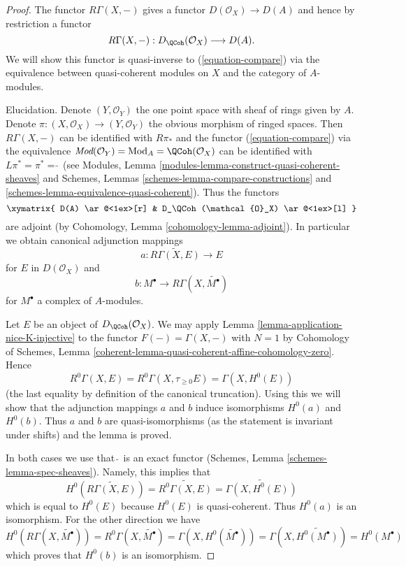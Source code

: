 \begin{proof}
The functor $R\Gamma(X, -)$ gives a functor
$D(\mathcal{O}_X) \to D(A)$ and hence by restriction a functor
\begin{equation}
\label{equation-back}
R\Gamma(X, -) : D_\QCoh(\mathcal{O}_X) \longrightarrow D(A).
\end{equation}
We will show this functor is quasi-inverse to (\ref{equation-compare})
via the equivalence between quasi-coherent modules on $X$ and
the category of $A$-modules.

\medskip\noindent
Elucidation. Denote $(Y, \mathcal{O}_Y)$ the one point space with sheaf
of rings given by $A$. Denote
$\pi : (X, \mathcal{O}_X) \to (Y, \mathcal{O}_Y)$
the obvious morphism of ringed spaces.
Then $R\Gamma(X, -)$ can be identified with $R\pi_*$ and the functor
(\ref{equation-compare}) via the equivalence
$\textit{Mod}(\mathcal{O}_Y) = \text{Mod}_A = \QCoh(\mathcal{O}_X)$
can be identified with $L\pi^* = \pi^* = \widetilde{\ }$ (see
Modules, Lemma \ref{modules-lemma-construct-quasi-coherent-sheaves} and
Schemes, Lemmas \ref{schemes-lemma-compare-constructions} and
\ref{schemes-lemma-equivalence-quasi-coherent}). Thus the functors
$$
\xymatrix{
D(A) \ar@<1ex>[r] & D_\QCoh(\mathcal{O}_X) \ar@<1ex>[l]
}
$$
are adjoint (by Cohomology, Lemma \ref{cohomology-lemma-adjoint}). In
particular we obtain canonical adjunction mappings
$$
a : \widetilde{R\Gamma(X, E)} \longrightarrow E
$$
for $E$ in $D(\mathcal{O}_X)$ and
$$
b : M^\bullet \longrightarrow R\Gamma(X, \widetilde{M^\bullet})
$$
for $M^\bullet$ a complex of $A$-modules.

\medskip\noindent
Let $E$ be an object of $D_\QCoh(\mathcal{O}_X)$. We may apply
Lemma \ref{lemma-application-nice-K-injective}
to the functor $F(-) = \Gamma(X, -)$
with $N = 1$ by Cohomology of Schemes, Lemma
\ref{coherent-lemma-quasi-coherent-affine-cohomology-zero}.
Hence
$$
R^0\Gamma(X, E) = R^0\Gamma(X, \tau_{\geq 0}E) = \Gamma(X, H^0(E))
$$
(the last equality by definition of the canonical truncation).
Using this we will show that the adjunction mappings $a$ and $b$
induce isomorphisms $H^0(a)$ and $H^0(b)$. Thus $a$ and $b$
are quasi-isomorphisms (as the statement is invariant under shifts)
and the lemma is proved.

\medskip\noindent
In both cases we use that $\widetilde{\ }$ is an exact functor
(Schemes, Lemma \ref{schemes-lemma-spec-sheaves}). Namely, this
implies that
$$
H^0\left(\widetilde{R\Gamma(X, E)}\right) = \widetilde{R^0\Gamma(X, E)}
= \widetilde{\Gamma(X, H^0(E))}
$$
which is equal to $H^0(E)$ because $H^0(E)$ is quasi-coherent. Thus
$H^0(a)$ is an isomorphism. For the other direction we have
$$
H^0(R\Gamma(X, \widetilde{M^\bullet})) =
R^0\Gamma(X, \widetilde{M^\bullet}) =
\Gamma(X, H^0(\widetilde{M^\bullet})) =
\Gamma(X, \widetilde{H^0(M^\bullet)}) = H^0(M^\bullet)
$$
which proves that $H^0(b)$ is an isomorphism.
\end{proof}

